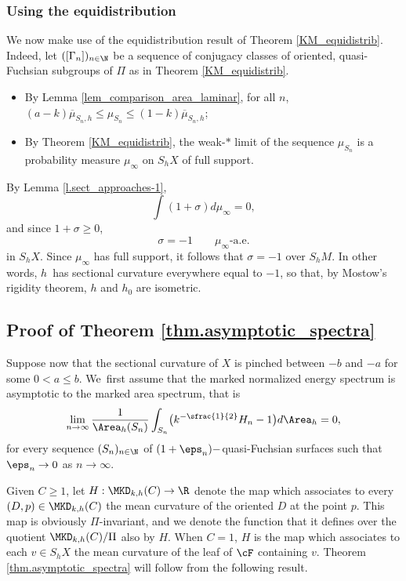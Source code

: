 \subsubsection{Using the equidistribution} We now make use of the equidistribution result of Theorem \ref{KM_equidistrib}. Indeed, let $([\Gamma_n])_{n\in\N}$ be a sequence of conjugacy classes of oriented, quasi-Fuchsian subgroups of $\Pi$ as in Theorem \ref{KM_equidistrib}.
\begin{itemize}
\item By Lemma \ref{lem_comparison_area_laminar}, for all $n$, $(a-k)\overline\mu_{S_n,h}\leq\mu_{S_n}\leq(1-k)\overline\mu_{S_n,h}$;
\item By Theorem \ref{KM_equidistrib}, the weak-$\ast$ limit of the sequence $\mu_{S_n}$ is a probability measure $\mu_\infty$ on $S_hX$ of full support.
\end{itemize}
By Lemma \ref{l.sect_approaches-1},
\begin{equation*}
\int(1+\sigma)d\mu_\infty=0,
\end{equation*}
and since $1+\sigma\geq 0$,
\begin{equation*}
\sigma=-1\qquad \mu_\infty\text{-a.e.}
\end{equation*} in $S_hX$. Since $\mu_\infty$ has full support, it follows that $\sigma=-1$ over $S_hM$. In other words, $h$~has sectional curvature everywhere equal to $-1$, so that, by Mostow's rigidity theorem, $h$ and $h_0$ are isometric.

\subsection{Proof of Theorem \ref{thm.asymptotic_spectra}}\label{ss.proof_of_thm_B}

Suppose now that the sectional curvature of $X$ is pinched between $-b$ and $-a$ for some $0<a\leq b$. We~first assume that the marked normalized energy spectrum is asymptotic to the marked area spectrum, that is
\begin{equation}\label{eq.hypothesis}
\lim_{n\to\infty}\frac{1}{\Area_h(S_n)}\int_{S_n}\bigl(k^{-\sfrac{1}{2}}H_n-1\bigr)d\Area_h=0,
\end{equation}
for every sequence $(S_n)_{n \in\N}$ of $(1+\eps_n)-$quasi-Fuchsian surfaces such that $\eps_n\to 0$ as $n\to\infty$.

Given $C\geq 1$, let $H:\MKD_{k,h}(C)\to\R$ denote the map which associates to every $(D,p)\in \MKD_{k,h}(C)$ the mean curvature of the oriented \kdisk $D$ at the point $p$. This map is obviously $\Pi$-invariant, and we denote the function that it defines over the quotient $\MKD_{k,h}(C)/\Pi$ also by $H$. When $C=1$, $H$ is the map which associates to each $v\in S_hX$ the mean curvature of the leaf of $\cF$ containing $v$. Theorem \ref{thm.asymptotic_spectra} will follow from the following result.

